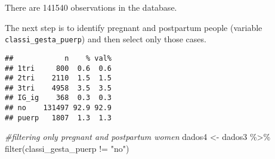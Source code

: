 \documentclass[
]{article}
\newenvironment{Shaded}{\begin{snugshade}}{\end{snugshade}}
\newcommand{\AttributeTok}[1]{\textcolor[rgb]{0.77,0.63,0.00}{#1}}
\newcommand{\CommentTok}[1]{\textcolor[rgb]{0.56,0.35,0.01}{\textit{#1}}}
\newcommand{\ConstantTok}[1]{\textcolor[rgb]{0.00,0.00,0.00}{#1}}
\newcommand{\DecValTok}[1]{\textcolor[rgb]{0.00,0.00,0.81}{#1}}
\newcommand{\DocumentationTok}[1]{\textcolor[rgb]{0.56,0.35,0.01}{\textbf{\textit{#1}}}}
\newcommand{\FunctionTok}[1]{\textcolor[rgb]{0.00,0.00,0.00}{#1}}
\newcommand{\NormalTok}[1]{#1}
\newcommand{\OtherTok}[1]{\textcolor[rgb]{0.56,0.35,0.01}{#1}}
\newcommand{\SpecialCharTok}[1]{\textcolor[rgb]{0.00,0.00,0.00}{#1}}
\newcommand{\StringTok}[1]{\textcolor[rgb]{0.31,0.60,0.02}{#1}}
\begin{document}
There are 141540 observations in the database.

The next step is to identify pregnant and postpartum people (variable
\texttt{classi\_gesta\_puerp}) and then select only those cases.

\begin{Shaded}
\end{Shaded}

\begin{verbatim}
##            n    % val%
## 1tri     800  0.6  0.6
## 2tri    2110  1.5  1.5
## 3tri    4958  3.5  3.5
## IG_ig    368  0.3  0.3
## no    131497 92.9 92.9
## puerp   1807  1.3  1.3
\end{verbatim}

\begin{Shaded}
\begin{Highlighting}[]
\CommentTok{\#filtering only pregnant and postpartum women}
\NormalTok{dados4 }\OtherTok{\textless{}{-}}\NormalTok{ dados3 }\SpecialCharTok{\%\textgreater{}\%}
  \FunctionTok{filter}\NormalTok{(classi\_gesta\_puerp }\SpecialCharTok{!=} \StringTok{"no"}\NormalTok{)}
\end{Highlighting}
\end{Shaded}
\end{document}
